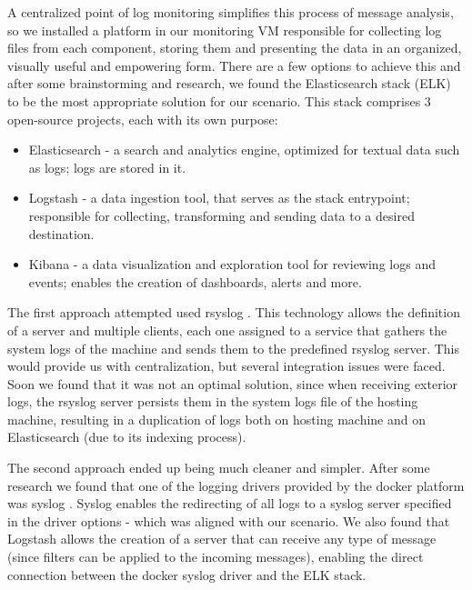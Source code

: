 \documentclass[12pt]{article}
\begin{document}
A centralized point of log monitoring simplifies this process of message analysis, so we installed a platform in our monitoring VM responsible for collecting
log files from each component, storing them and presenting the data in an organized, visually useful and empowering form.
There are a few options to achieve this and after some brainstorming and research, we found the Elasticsearch stack (ELK) \cite{elk} to be the most appropriate
solution for our scenario.
This stack comprises 3 open-source projects, each with its own purpose:

\vspace{-10pt}
\begin{itemize} [noitemsep]
  \item Elasticsearch - a search and analytics engine, optimized for textual data such as logs; logs are stored in it.
  \item Logstash - a data ingestion tool, that serves as the stack entrypoint; responsible for collecting, transforming and sending data to a desired destination.
  \item Kibana - a data visualization and exploration tool for reviewing logs and events; enables the creation of dashboards, alerts and more.
\end{itemize}
\vspace{-10pt}

The first approach attempted used rsyslog \cite{rsyslog}.
This technology allows the definition of a server and multiple clients, each one assigned to a service that gathers the system logs of the machine and sends
them to the predefined rsyslog server.
This would provide us with centralization, but several integration issues were faced.
Soon we found that it was not an optimal solution, since when receiving exterior logs, the rsyslog server persists them in the system logs file of the hosting machine, resulting
in a duplication of logs both on hosting machine and on Elasticsearch (due to its indexing process).

The second approach ended up being much cleaner and simpler.
After some research we found that one of the logging drivers provided by the docker platform was syslog \cite{dockersyslog}.
Syslog enables the redirecting of all logs to a syslog server specified in the driver options - which was aligned with our scenario.
We also found that Logstash allows the creation of a server that can receive any type of message (since filters can be applied to the incoming messages),
enabling the direct connection between the docker syslog driver and the ELK stack.
\end{document}
